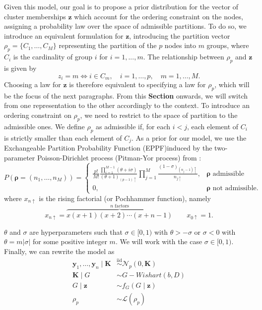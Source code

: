 Given this model, our goal is to propose a prior distribution for the vector of cluster memberships $\mathbf{z}$ which account for the ordering constraint on the nodes, assigning a probability law over the space of admissible partitions. To do so, we introduce an equivalent formulation for $\mathbf{z}$, introducing the partition vector $\rho_p=\{C_1,\ldots,C_M\}$ representing the partition of the $p$ nodes into $m$ groups, where $C_i$ is the cardinality of group $i$ for $i=1,...,m$. The relationship between $\rho_p$ and $\mathbf{z}$ is given by 
\[
z_i=m \iff i \in C_m, \quad i=1, \ldots, p, \quad m=1, \ldots, M.
\]
Choosing a law for $\mathbf{z}$ is therefore equivalent to specifying a law for $\rho_p$, which will be the focus of the next paragraphs. From this \textbf{Section} onwards, we will switch from one representation to the other accordingly to the context. To introduce an ordering constraint on $\rho_p$, we need to restrict to the space of partition to the admissible ones.
We define $\rho_p$ as admissible if, for each $i<j$, each element of $C_i$ is strictly smaller than each element of $C_j$. 
As a prior for our model, we use the Exchangeable Partition Probability Function (EPPF)induced by the two-parameter Poisson-Dirichlet process (Pitman-Yor process) from \textcite[830]{martinezNonparametricChangePoint2014}:
\[
    P(\bm{\rho} = (n_1, \ldots, n_M))
    =
    \begin{cases}
        \frac{p!}{M!} \frac{ \prod_{i=1}^{M-1}{(\theta +i\sigma)} }{(\theta+1)_{(p-1)\uparrow}} \prod_{j=1}^{M}{\frac{(1-\sigma)_{(n_{j}-1)\uparrow}}{n_{j\uparrow}} }, & \bm{\rho} \text{ admissible}\\
                0, & \bm{\rho} \text{ not admissible.}
    \end{cases}
\]
where $x_{n\uparrow}$ is the rising factorial (or Pochhammer function), namely
\begin{equation*}
x_{n\uparrow} = \overbrace{x(x+1)(x+2)\cdots(x+n-1)}^{n\text{ factors}} \qquad x_{0\uparrow}=1.
\end{equation*}

$\theta$ and $\sigma$ are hyperparameters such that $\sigma\in[0,1)$ with $\theta>-\sigma$ or $\sigma<0$ with $\theta=m|\sigma|$ for some positive integer $m$. We will work with the case $\sigma\in[0,1)$.\\

Finally, we can rewrite the model as
 \begin{align*}
    \mathbf{y}_1,\ldots,\mathbf{y}_n \mid \mathbf{K} & \overset{\mathrm{iid}}{\sim} \mathcal{N}_p(0,\mathbf{K}) \\
    \mathbf{K} \mid G & \sim G-Wishart(b,D) \\
    G \mid \mathbf{z} & \sim f_G(G\mid\mathbf{z})\\
    \rho_p & \sim \mathcal{L}(\rho_p)
\end{align*}

